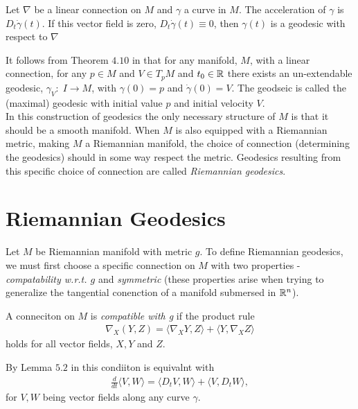 \begin{definition}
Let $\nabla$ be a linear connection on $M$ and $\gamma$ a curve in $M$. The acceleration of $\gamma$ is $D_t \dot{\gamma}(t)$. If this vector field is zero, $D_t \dot{\gamma}(t) \equiv 0$, then $\gamma(t)$ is a geodesic with respect to $\nabla$
\end{definition}

It follows from Theorem $4.10$ in  that for any manifold, $M$, with a linear connection, for any $p \in M$ and $V \in T_pM$ and $t_0 \in \mathbb{R}$ there exists an un-extendable geodesic, $\gamma_V: \; I \rightarrow M$, with $\gamma(0) = p$ and $\dot{\gamma}(0) = V$. The geodseic is called the (maximal) geodesic with initial value $p$ and initial velocity $V$. \\[0.2 cm]

In this construction of geodesics the only necessary structure of $M$ is that it should be a smooth manifold. When $M$ is also equipped with a Riemannian metric, making $M$ a Riemannian manifold, the choice of connection (determining the geodesics) should in some way respect the metric. Geodesics resulting from this specific choice of connection are called \textit{Riemannian geodesics}.

\section{Riemannian Geodesics}

Let $M$ be Riemannian manifold with metric $g$. To define Riemannian geodesics, we must first choose a specific connection on $M$ with two properties - \textit{compatability w.r.t. $g$} and \textit{symmetric} (these properties arise when trying to generalize the tangential conenction of a manifold submersed in $\mathbb{R}^n$).

\begin{definition}
A conneciton on $M$ is \textit{compatible with g} if the product rule
\begin{align*}
\nabla_X (Y, Z) = \langle \nabla_X Y, Z \rangle + \langle Y, \nabla_X Z \rangle
\end{align*}
holds for all vector fields, $X, Y$ and $Z$.
\end{definition}

By Lemma $5.2$ in  this condiiton is equivalnt with
\begin{align*}
\frac{d}{dt} \langle V, W \rangle = \langle D_t V, W \rangle + \langle V, D_t W \rangle,
\end{align*} 
for $V, W$ being vector fields along any curve $\gamma$. \\[0.2 cm]

